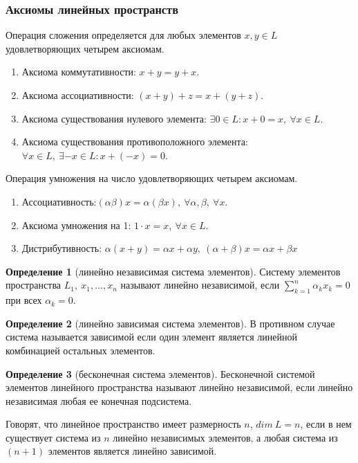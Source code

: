 \documentclass[14pt,a4paper]{extarticle}
\theoremstyle{definition}
\newtheorem{definition}{Определение}[section]
\theoremstyle{remark}
\renewcommand{\[}{\begin{dmath*}[compact]}
\renewcommand{\]}{\end{dmath*}}
\newcommand{\be}{\begin{enumerate}}
\newcommand{\ee}{\end{enumerate}}
\newcommand{\ds}{\displaystyle}
\newcommand{\sep}{ , \ \allowbreak }
\begin{document}
\subsubsection{Аксиомы линейных пространств}

Операция сложения определяется для любых элементов $x,y \in L$
удовлетворяющих четырем аксиомам.

\be
  \item Аксиома коммутативности: $x+y = y+x$.

  \item Аксиома ассоциативности: $(x+y)+z = x+(y+z)$.

  \item Аксиома существования нулевого элемента:
  $\exists 0 \in L: x+0=x \sep \forall x \in L$.

  \item Аксиома существования противоположного элемента:
  $\forall x \in L \sep \exists -x \in L: x+(-x)=0$.
\ee

Операция умножения на число удовлетворяющих четырем аксиомам.
\be
  \item Ассоциативность:$(\alpha \beta) x = \alpha (\beta x) \sep
  \forall \alpha, \beta \sep \forall x$.

  \item Аксиома умножения на 1: $1\cdot x = x \sep \forall x \in L$.

  \item Дистрибутивность: $\alpha (x+y)=\alpha x + \alpha y \sep
  (\alpha + \beta) x = \alpha x + \beta x$
\ee

\begin{definition}[линейно независимая система элементов]
  Систему элементов пространства $L_1 \sep x_1, \dots, x_n$ называют
  линейно независимой, если $\ds\sum_{k=1}^n \alpha_k x_k = 0$
  при всех $\alpha_k = 0$.
\end{definition}
\begin{definition}[линейно зависимая система элементов]
  В противном случае система называется зависимой если один элемент
  является линейной комбинацией остальных элементов.
\end{definition}

\begin{definition}[бесконечная система элементов]
  Бесконечной системой элементов линейного пространства называют
  линейно независимой, если линейно независимая любая ее конечная подсистема.
\end{definition}

Говорят, что линейное пространство имеет размерность $n$, $dim\ L=n$,
если в нем существует система из $n$ линейно независимых элементов,
а любая система из $(n+1)$ элементов является линейно зависимой.
\end{document}
